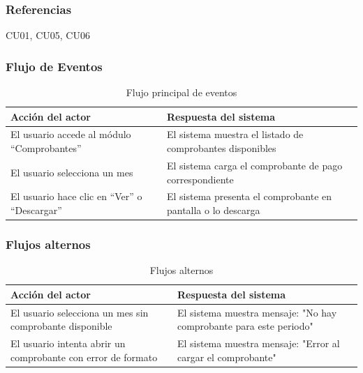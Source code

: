 \subsubsection*{Referencias}
CU01, CU05, CU06

\subsubsection*{Flujo de Eventos}
\begin{table}[h]
	\centering
	\caption{Flujo principal de eventos}
	\begin{tabular}{|p{7cm}|p{7cm}|}
		\hline
		\textbf{Acción del actor}                   & \textbf{Respuesta del sistema}                               \\ \hline
		El usuario accede al módulo “Comprobantes”  & El sistema muestra el listado de comprobantes disponibles    \\ \hline
		El usuario selecciona un mes                & El sistema carga el comprobante de pago correspondiente      \\ \hline
		El usuario hace clic en “Ver” o “Descargar” & El sistema presenta el comprobante en pantalla o lo descarga \\ \hline
	\end{tabular}
\end{table}

\subsubsection*{Flujos alternos}
\begin{table}[h]
	\centering
	\caption{Flujos alternos}
	\begin{tabular}{|p{7cm}|p{7cm}|}
		\hline
		\textbf{Acción del actor}                                    & \textbf{Respuesta del sistema}                                     \\ \hline
		El usuario selecciona un mes sin comprobante disponible      & El sistema muestra mensaje: "No hay comprobante para este periodo" \\ \hline
		El usuario intenta abrir un comprobante con error de formato & El sistema muestra mensaje: "Error al cargar el comprobante"       \\ \hline
	\end{tabular}
\end{table}


